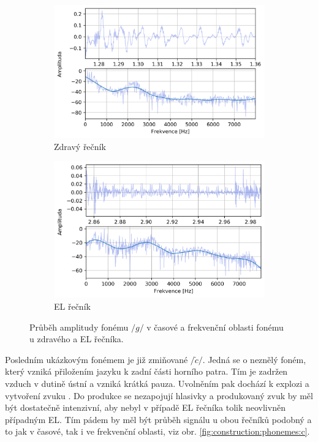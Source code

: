 \begin{figure}[htpb]
  \centering
  \begin{subfigure}[b]{0.45\textwidth}
    \includegraphics[width=\textwidth]{./ch5-construction/img/signal-normal_g.png}
    \caption{Zdravý řečník}
    \label{fig:construction:phonemes:g:normal}
  \end{subfigure}
  \begin{subfigure}[b]{0.45\textwidth}
    \includegraphics[width=\textwidth]{./ch5-construction/img/signal-el_g.png}
    \caption{EL řečník}
    \label{fig:construction:phonemes:g:el}
  \end{subfigure}
  \caption[Průběh amplitudy fonému $/g/$ zdravého a EL řečníka.]{Průběh amplitudy fonému $/g/$ v časové a frekvenční oblasti fonému u zdravého a EL řečníka.}
  \label{fig:construction:phonemes:g}
\end{figure}

Posledním ukázkovým fonémem je již zmiňované $/\check{c}/$.
Jedná se o neznělý foném, který vzniká přiložením jazyku k zadní části horního patra.
Tím je zadržen vzduch v dutině ústní a vzniká krátká pauza.
Uvolněním pak dochází k explozi a vytvoření zvuku \cite{Psutka2006}.
Do produkce se nezapojují hlasivky a produkovaný zvuk by měl být dostatečně intenzivní, aby nebyl v případě EL řečníka tolik neovlivněn případným EL.
Tím pádem by měl být průběh signálu u obou řečníků podobný a to jak v časové, tak i ve frekvenční oblasti, viz obr. \ref{fig:construction:phonemes:c}.

